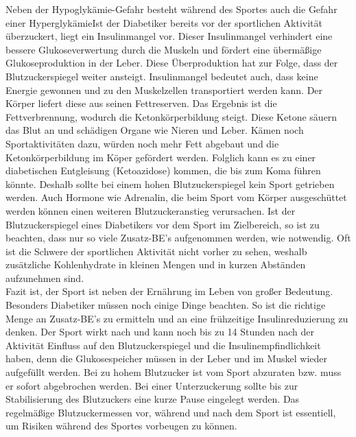 	Neben der Hypoglykämie-Gefahr besteht während des Sportes auch die Gefahr einer HyperglykämieIst der Diabetiker bereits vor der sportlichen Aktivität überzuckert, liegt ein Insulinmangel vor. Dieser Insulinmangel  verhindert eine bessere Glukoseverwertung durch die Muskeln und fördert eine übermäßige Glukoseproduktion in der Leber. Diese Überproduktion hat zur Folge, dass der Blutzuckerspiegel weiter ansteigt. Insulinmangel bedeutet auch, dass keine Energie gewonnen und zu den Muskelzellen transportiert werden kann. Der Körper liefert diese aus seinen Fettreserven. Das Ergebnis ist die Fettverbrennung, wodurch die Ketonkörperbildung steigt. Diese Ketone säuern das Blut an und schädigen Organe wie Nieren und Leber. Kämen noch Sportaktivitäten dazu, würden noch mehr Fett abgebaut und die Ketonkörperbildung im Köper gefördert werden. Folglich kann es zu einer diabetischen Entgleisung (Ketoazidose) kommen, die bis zum Koma führen könnte. Deshalb sollte bei einem hohen Blutzuckerspiegel kein Sport getrieben werden. Auch Hormone wie Adrenalin, die beim Sport vom Körper ausgeschüttet werden können einen weiteren Blutzuckeranstieg verursachen. \newline
	Ist der Blutzuckerspiegel eines Diabetikers vor dem Sport im Zielbereich, so ist zu beachten, dass nur so viele Zusatz-BE’s aufgenommen werden, wie notwendig. Oft ist die Schwere der sportlichen Aktivität nicht vorher zu sehen, weshalb zusätzliche Kohlenhydrate in kleinen Mengen und in kurzen Abständen aufzunehmen sind.  \cite{SG}\\
	Fazit ist, der Sport ist neben der Ernährung im Leben von großer Bedeutung. Besonders Diabetiker müssen noch einige Dinge beachten. So ist die richtige Menge an Zusatz-BE’s zu ermitteln und an eine frühzeitige Insulinreduzierung zu denken. Der Sport wirkt nach und kann noch bis zu 14 Stunden nach der Aktivität Einfluss auf den Blutzuckerspiegel und die Insulinempfindlichkeit haben, denn die Glukosespeicher müssen in der Leber und im Muskel wieder aufgefüllt werden. Bei zu hohem Blutzucker ist vom Sport abzuraten bzw. muss er sofort abgebrochen werden. Bei einer Unterzuckerung sollte bis zur Stabilisierung des Blutzuckers eine kurze Pause eingelegt werden. Das regelmäßige Blutzuckermessen vor, während und nach dem Sport ist essentiell, um Risiken während des Sportes vorbeugen zu können. \cite{SG}
